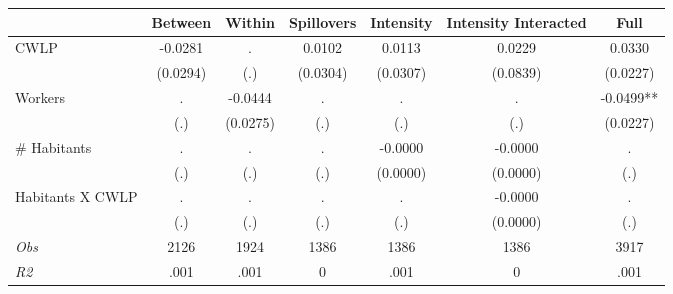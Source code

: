 \begin{tabular}{l*{6}{c}}\hline&\multicolumn{1}{c}{Between}&\multicolumn{1}{c}{Within}&\multicolumn{1}{c}{Spillovers}&\multicolumn{1}{c}{Intensity}&\multicolumn{1}{c}{Intensity Interacted}&\multicolumn{1}{c}{Full}\\ \hline 
CWLP & -0.0281 & . & 0.0102 & 0.0113 & 0.0229 & 0.0330 \\
 & (0.0294) & (.) & (0.0304) & (0.0307) & (0.0839) & (0.0227) \\
Workers & . & -0.0444 & . & . & . & -0.0499** \\
 & (.) & (0.0275) & (.) & (.) & (.) & (0.0227) \\
\# Habitants & . & . & . & -0.0000 & -0.0000 & . \\
 & (.) & (.) & (.) & (0.0000) & (0.0000) & (.) \\
Habitants X CWLP & . & . & . & . & -0.0000 & . \\
 & (.) & (.) & (.) & (.) & (0.0000) & (.) \\
\hline \textit{Obs} & 2126 & 1924 & 1386 & 1386 & 1386 & 3917 \\ \textit{R2} & .001 & .001 & 0 & .001 & 0 & .001 \\ \hline \end{tabular}
